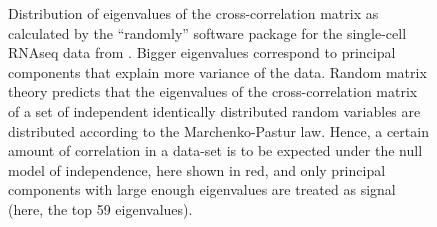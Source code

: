 \documentclass[review]{elsarticle}
\begin{document}
\begin{figure}
\centering
{}
\caption{Distribution of eigenvalues of the cross-correlation matrix as calculated by the ``randomly'' software package \cite{Aparicio2018} for the single-cell RNAseq data from \cite{Morrison2017}. Bigger eigenvalues correspond to principal components that explain more variance of the data. Random matrix theory predicts that the eigenvalues of the cross-correlation matrix of a set of independent identically distributed random variables are distributed according to the Marchenko-Pastur law. Hence, a certain amount of correlation in a data-set is to be expected under the null model of independence, here shown in red, and only principal components with large enough eigenvalues are treated as signal (here, the top 59 eigenvalues). \label{figMP}}
\end{figure}
\end{document}
